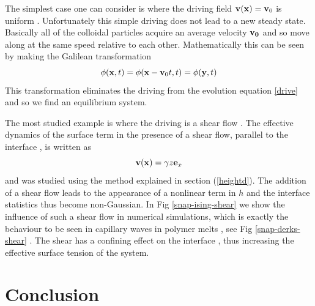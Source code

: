 The simplest case one can consider is where the driving field ${\bf v}({\bf x}) ={\bf v}_0$ is uniform \cite{leung_field_1986.bray_coarsening_2000}. Unfortunately this simple driving does not lead to a new steady state. Basically all of the colloidal particles acquire an average velocity ${\bf v_0}$ and so move along at the same speed relative to each other. Mathematically this can be seen by making the Galilean transformation
\begin{equation}
\phi ({\bf x},t)= \phi({\bf x}-{\bf v}_0t,t) = \phi({\bf y},t)
\end{equation}
This transformation eliminates the driving from the evolution equation \eqref{drive} and so we find an equilibrium system. 

The most studied example is where the driving is a shear flow \cite{derks_suppression_2006,thiebaud_nonequilibrium_2010}. The effective dynamics of the surface term in the presence of a shear flow, parallel to the interface \cite{bray_interface_2001,bray_interface_2001-1,}, is written as
\begin{equation}
{\bf v}({\bf x}) = \gamma z {\bf e}_x
\label{eq-cisaillement}
\end{equation}
and was studied using the method explained in section (\ref{heightd}). The addition of a shear flow leads to the appearance of a nonlinear term in $h$ and the interface statistics thus become non-Gaussian. In Fig \ref{snap-ising-shear} we show the influence of such a shear flow in numerical simulations, which is exactly the behaviour to be seen in capillary waves in polymer melts \cite{derks_confocal_2004,derks_suppression_2006}, see Fig \ref{snap-derks-shear} . The shear has a confining effect on the interface \cite{smith_driven_2010,smith_interfaces_2008-1,smith_interfaces_2008}, thus increasing the effective surface tension of the system.




\section{Conclusion}

